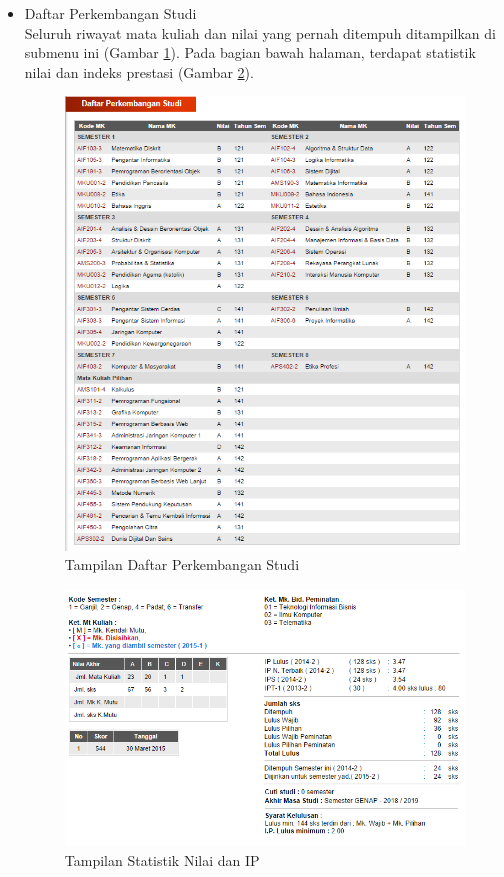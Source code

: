 \begin{enumerate}
\begin{itemize}
\begin{itemize}
			\item Daftar Perkembangan Studi \\
			Seluruh riwayat mata kuliah dan nilai yang pernah ditempuh ditampilkan di submenu ini (Gambar \ref{fig:3_pam_utama_dps}). Pada bagian bawah halaman, terdapat statistik nilai dan indeks prestasi (Gambar \ref{fig:3_pam_utama_dpsstat}). 
			\begin{figure}[H]
				\centering
				\includegraphics[scale=0.5]{Gambar/pam-utama-dps}
				\caption{Tampilan Daftar Perkembangan Studi} 
				\label{fig:3_pam_utama_dps}
			\end{figure}
			
			\begin{figure}[H]
				\centering
				\includegraphics[scale=0.5]{Gambar/pam-utama-dpsstat}
				\caption{Tampilan Statistik Nilai dan IP} 
				\label{fig:3_pam_utama_dpsstat}
			\end{figure}
			

\end{itemize}
\end{itemize}
\end{enumerate}
